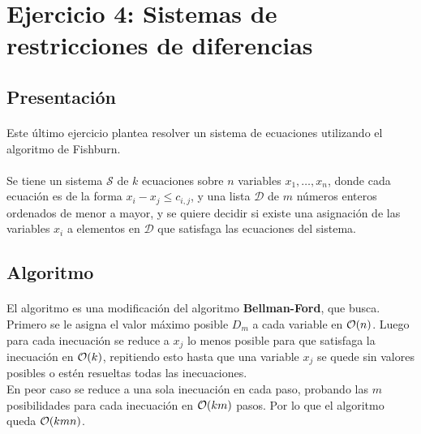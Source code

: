 \documentclass[../main.tex]{subfiles}
\begin{document}
\section{Ejercicio 4: Sistemas de restricciones de diferencias}

\subsection{Presentación}
\label{sec:ej4-intro}
\paragraph{} Este último ejercicio plantea resolver un sistema de ecuaciones utilizando el algoritmo de Fishburn. %

\paragraph{} Se tiene un sistema \(\mathcal{S}\) de \(k\) ecuaciones sobre \(n\) variables \(x_{1}, \ldots, x_{n}\), donde cada ecuación es de la forma \(x_{i} - x_{j} \leq c_{i,j}\), y una lista \(\mathcal{D}\) de \(m\) números enteros ordenados de menor a mayor, y se quiere decidir si existe una asignación de las variables \(x_{i}\) a elementos en \(\mathcal{D}\) que satisfaga las ecuaciones del sistema. %

\subsection{Algoritmo}
\label{sec:ej4-algo}
\paragraph{} El algoritmo es una modificación del algoritmo \textbf{Bellman-Ford}, que busca. Primero se le asigna el valor máximo posible \(D_{m}\) a cada variable en \(\mathcal{O}(n)\). Luego para cada inecuación se reduce a \(x_{j}\) lo menos posible para que satisfaga la inecuación en \(\mathcal{O}(k)\), repitiendo esto hasta que una variable \(x_{j}\) se quede sin valores posibles o estén resueltas todas las inecuaciones. \\ %
En peor caso se reduce a una sola inecuación en cada paso, probando las \(m\) posibilidades para cada inecuación en \(\mathcal{O}(km)\) pasos. Por lo que el algoritmo queda \(\mathcal{O}(kmn)\).
\end{document}
